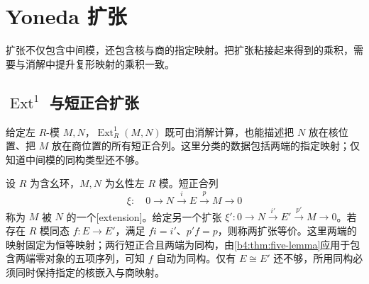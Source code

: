 
\section{Yoneda 扩张}
\label{b4:sec:0901}

扩张不仅包含中间模，还包含核与商的指定映射。把扩张粘接起来得到的乘积，需要与消解中提升复形映射的乘积一致。

%
%

\subsection{\texorpdfstring{\(\operatorname{Ext}^1\) 与短正合扩张}{Ext1 与短正合扩张}}
\label{b4:subsec:0901:01}

给定左 \(R\)-模 \(M,N\)，\(\operatorname{Ext}_R^1(M,N)\) 既可由消解计算，也能描述把 \(N\) 放在核位置、把 \(M\) 放在商位置的所有短正合列。这里分类的数据包括两端的指定映射；仅知道中间模的同构类型还不够。

\begin{definition}\label{b4:def:yoneda-extension}
	设 \(R\) 为含幺环，\(M,N\) 为幺性左 \(R\) 模。短正合列
	\[
		\xi:\quad 0\longrightarrow N\xrightarrow{i}E\xrightarrow{p}M\longrightarrow0
	\]
	称为 \(M\) 被 \(N\) 的一个[extension]。给定另一个扩张 \(\xi':0\to N\xrightarrow{i'}E'\xrightarrow{p'}M\to0\)。若存在 \(R\) 模同态 \(f:E\to E'\)，满足 \(fi=i'\)、\(p'f=p\)，则称两扩张等价。这里两端的映射固定为恒等映射；两行短正合且两端为同构，由\cref{b4:thm:five-lemma}应用于包含两端零对象的五项序列，可知 \(f\) 自动为同构。仅有 \(E\cong E'\) 还不够，所用同构必须同时保持指定的核嵌入与商映射。
\end{definition}

